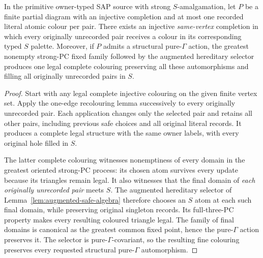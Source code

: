 \begin{lemma}
\label{lem:safe-global-completion}
In the primitive owner-typed SAP source with strong $S$-amalgamation,
let $P$ be a finite partial diagram with an injective completion
and at most one recorded literal atomic colour per pair.
There exists an injective \emph{same-vertex} completion in which
every originally unrecorded pair receives a colour in its
corresponding typed $S$ palette.
Moreover, if $P$ admits a structural pure-$\Gamma$ action,
the greatest nonempty strong-PC fixed family followed by the
augmented hereditary selector produces one legal complete
colouring preserving all these automorphisms and filling
all originally unrecorded pairs in $S$.
\end{lemma}
\begin{proof}
Start with any legal complete injective colouring on
the given finite vertex set.  Apply the one-edge recolouring
lemma successively to every originally unrecorded pair.
Each application changes only the selected pair and
retains all other pairs, including previous safe choices
and all original literal records.  It produces a complete
legal structure with the same owner labels, with every
original hole filled in $S$.

The latter complete colouring witnesses nonemptiness of
every domain in the greatest oriented strong-PC process:
its chosen atom survives every update because its triangles
remain legal.  It also witnesses that the final domain of
\emph{each originally unrecorded pair} meets $S$.
The augmented hereditary selector of
Lemma~\ref{lem:augmented-safe-algebra} therefore chooses
an $S$ atom at each such final domain, while preserving
original singleton records.  Its full-three-PC property
makes every resulting coloured triangle legal.
The family of final domains is canonical as the greatest
common fixed point, hence the pure-$\Gamma$ action
preserves it.  The selector is pure-$\Gamma$-covariant,
so the resulting fine colouring preserves every requested
structural pure-$\Gamma$ automorphism.
\end{proof}

